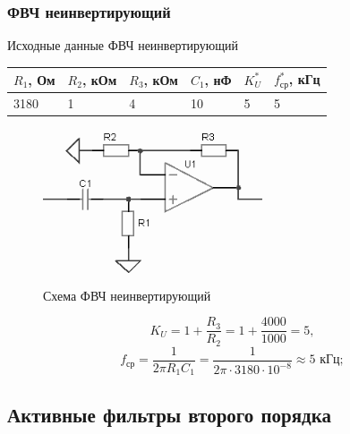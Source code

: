 \documentclass[a4paper, 12pt]{article}
\begin{document}
    \subsubsection{ФВЧ неинвертирующий} \label{sec:hpninv}
    Исходные данные ФВЧ неинвертирующий
    \begin{center}
        \begin{tabular}{ | m{3.5em} | m{4em}| m{4em} | m{3.5em} | m{2.5em} | m{3.5em} |} 
        \hline
        $R_1$, Ом& $R_2$, кОм &$R_3$, кОм &$C_1$, нФ &$K_U^*$ &$f_\text{ср}^*$, кГц\\ 
        \hline
        3180& 1 &4 &10 &5 &5\\ 
        \hline
        \end{tabular}
    \end{center}
    \begin{figure}[H]
        \centering
        \includegraphics{high_pass_p.png}
        \captionsetup{skip=0pt}
        \caption{Схема ФВЧ неинвертирующий}
        \label{fig:null_scheme2}
    \end{figure}
    $$
    K_U=1+\dfrac{R_3}{R_2}=1+\dfrac{4000}{1000}=5,
    $$
    $$
    f_\text{ср}=\dfrac{1}{2\pi R_1C_1}=\dfrac{1}{2\pi\cdot3180\cdot10^{-8}}\approx5\text{ кГц};
    $$


    \subsection{Активные фильтры второго порядка}
\end{document}
